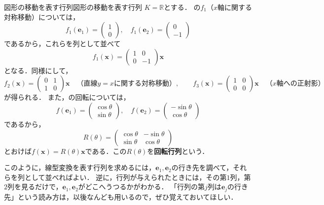 \begin{example}{図形の移動を表す行列}{図形の移動を表す行列}
  $K = \mathbb{R}$とする．
  の$f_1$（$x$軸に関する対称移動）については，
  \[
    f_1(\bm{e}_1) = \begin{pmatrix} 1 \\ 0 \end{pmatrix}, \quad
    f_1(\bm{e}_2) = \begin{pmatrix} 0 \\ -1 \end{pmatrix}
  \]
  であるから，これらを列として並べて
  \[
    f_1(\bm{x}) = \begin{pmatrix} 1 & 0 \\ 0 & -1 \end{pmatrix} \bm{x}
  \]
  となる．同様にして，
  \[
    f_2(\bm{x}) = \begin{pmatrix} 0 & 1 \\ 1 & 0 \end{pmatrix} \bm{x}
    \quad \text{（直線$y = x$に関する対称移動）}, \qquad
    f_3(\bm{x}) = \begin{pmatrix} 1 & 0 \\ 0 & 0 \end{pmatrix} \bm{x}
    \quad \text{（$x$軸への正射影）}
  \]
  が得られる．
  また，の回転については，
  \[
    f(\bm{e}_1) = \begin{pmatrix} \cos\theta \\ \sin\theta \end{pmatrix}, \quad
    f(\bm{e}_2) = \begin{pmatrix} -\sin\theta \\ \cos\theta \end{pmatrix}
  \]
  であるから，
  \[
    R(\theta) = \begin{pmatrix} \cos\theta & -\sin\theta \\ \sin\theta & \cos\theta \end{pmatrix}
  \]
  とおけば$f(\bm{x}) = R(\theta)\bm{x}$である．この$R(\theta)$を\textbf{回転行列}という．
\end{example}

このように，線型変換を表す行列を求めるには，$\bm{e}_1,\bm{e}_2$の行き先を調べて，それらを列として並べればよい．
逆に，行列が与えられたときには，その第$1$列，第$2$列を見るだけで，$\bm{e}_1,\bm{e}_2$がどこへうつるかがわかる．
「行列の第$j$列は$\bm{e}_j$の行き先」という読み方は，以後なんども用いるので，ぜひ覚えておいてほしい．

